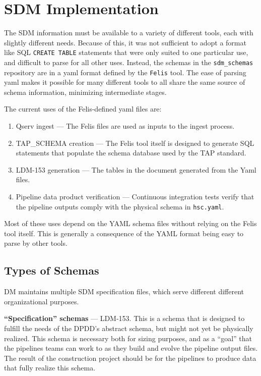 
\section{SDM Implementation}

The SDM information must be available to a variety of different tools, each with
slightly different needs. Because of this, it was not sufficient to adopt a format like SQL
\texttt{CREATE TABLE} statements that were only suited to one particular use, and difficult to parse
for all other uses. Instead, the schemas in the \texttt{sdm\_schemas} repository are in a yaml
format defined by the \texttt{Felis} tool. The ease of parsing yaml makes it possible for many
different tools to all share the same source of schema information, minimizing intermediate stages.

The current uses of the Felis-defined yaml files are:
\begin{enumerate}
\item Qserv ingest --- The Felis files are used as inputs to the ingest process.

\item TAP\_SCHEMA creation --- The Felis tool itself is designed to generate SQL statements that
    populate the schema database used by the TAP standard.

\item LDM-153 generation --- The tables in the document generated from the Yaml files.

\item Pipeline data product verification --- Continuous integration tests verify that the pipeline
    outputs comply with the physical schema in \texttt{hsc.yaml}.
\end{enumerate}

Most of these uses depend on the YAML schema files without relying on the Felis tool itself. This is
generally a consequence of the YAML format being easy to parse by other tools.

\subsection{Types of Schemas}

DM maintains multiple SDM specification files, which serve different different organizational
purposes. 

\textbf{``Specification'' schemas} --- LDM-153. This is a schema that is designed to fulfill the
needs of the DPDD's abstract schema, but might not yet be physically realized. This schema is
necessary both for sizing purposes, and as a ``goal'' that the pipelines teams can work to as they
build and evolve the pipeline output files. The result of the construction project should be for the
pipelines to produce data that fully realize this schema.

